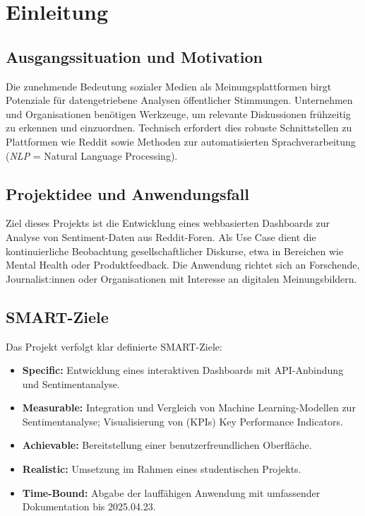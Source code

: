 \section{Einleitung}

\subsection{Ausgangssituation und Motivation}
Die zunehmende Bedeutung sozialer Medien als Meinungsplattformen birgt Potenziale für datengetriebene Analysen öffentlicher Stimmungen. Unternehmen und Organisationen benötigen Werkzeuge, um relevante Diskussionen frühzeitig zu erkennen und einzuordnen. Technisch erfordert dies robuste Schnittstellen zu Plattformen wie Reddit sowie Methoden zur automatisierten Sprachverarbeitung (\emph{NLP} = Natural Language Processing).

\subsection{Projektidee und Anwendungsfall}
Ziel dieses Projekts ist die Entwicklung eines webbasierten Dashboards zur Analyse von Sentiment-Daten aus Reddit-Foren. Als Use Case dient die kontinuierliche Beobachtung gesellschaftlicher Diskurse, etwa in Bereichen wie Mental Health oder Produktfeedback. Die Anwendung richtet sich an Forschende, Journalist:innen oder Organisationen mit Interesse an digitalen Meinungsbildern.

\subsection{SMART-Ziele}
Das Projekt verfolgt klar definierte SMART-Ziele:
\begin{itemize}
    \item \textbf{Specific:} Entwicklung eines interaktiven Dashboards mit API-Anbindung und Sentimentanalyse.
    \item \textbf{Measurable:} Integration und Vergleich von Machine Learning-Modellen zur Sentimentanalyse; Visualisierung von (KPIs) Key Performance Indicators.
    \item \textbf{Achievable:} Bereitstellung einer benutzerfreundlichen Oberfläche.
    \item \textbf{Realistic:} Umsetzung im Rahmen eines studentischen Projekts.
    \item \textbf{Time-Bound:} Abgabe der lauffähigen Anwendung mit umfassender Dokumentation bis 2025.04.23.
\end{itemize}